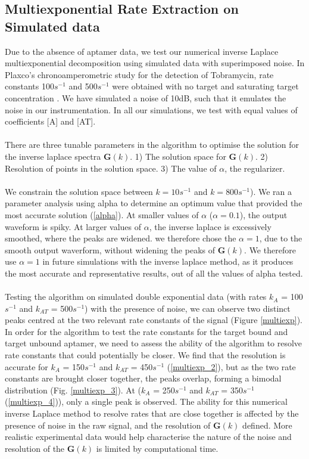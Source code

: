 \subsection{Multiexponential Rate Extraction on Simulated data}
\vspace{-1cm}
Due to the absence of aptamer data, we test our numerical inverse Laplace multiexponential decomposition using simulated data with superimposed noise. In Plaxco's chronoamperometric study for the detection of Tobramycin, rate constants 100$s^{-1}$ and 500$s^{-1}$ were obtained with no target and saturating target concentration \cite{arroyo2018subsecond}. We have simulated a noise of 10dB, such that it emulates the noise in our instrumentation. In all our simulations, we test with equal values of coefficients [A] and [AT].\\\\
There are three tunable parameters in the algorithm to optimise the solution for the inverse laplace spectra $\mathbf{G}(k)$. 1) The solution space for $\mathbf{G}(k)$. 2) Resolution of points in the solution space. 3) The value of $\alpha$, the regularizer. \\\\
We constrain the solution space between $k = 10s^{-1}$ and $k = 800s^{-1}$). We ran a parameter analysis using alpha to determine an optimum value that provided the most accurate solution (\autoref{alpha}). At smaller values of $\alpha$ ($\alpha = 0.1$), the output waveform is spiky. At larger values of $\alpha$, the inverse laplace is excessively smoothed, where the peaks are widened. we therefore chose the $\alpha = 1$, due to the smooth output waverform, without widening the peaks of $\mathbf{G}(k)$. We therefore use $\alpha = 1$ in future simulations with the inverse laplace method, as it produces the most accurate and representative results, out of all the values of alpha tested.\\\\
Testing the algorithm on simulated double exponential data (with rates $k_{A}$ = 100$s^{-1}$ and $k_{AT}$ = 500$s^{-1}$) with the presence of noise, we can observe two distinct peaks centred at the two relevant rate constants of the signal (Figure \ref{multiexp}). In order for the algorithm to test the rate constants for the target bound and target unbound aptamer, we need to assess the ability of the algorithm to resolve rate constants that could potentially be closer. We find that the resolution is accurate for $k_{A}$ = 150$s^{-1}$ and $k_{AT}$ = 450$s^{-1}$ (\autoref{multiexp_2}), but as the two rate constants are brought closer together, the peaks overlap, forming a bimodal distribution (Fig. \ref{multiexp_3}). At ($k_{A}$ = 250$s^{-1}$ and $k_{AT}$ = 350$s^{-1}$ (\autoref{multiexp_4})), only a single peak is observed. The ability for this numerical inverse Laplace method to resolve rates that are close together is affected by the presence of noise in the raw signal, and the resolution of $\mathbf{G}(k)$ defined. More realistic experimental data would help characterise the nature of the noise and resolution of the $\mathbf{G}(k)$ is limited by computational time.\\\\
